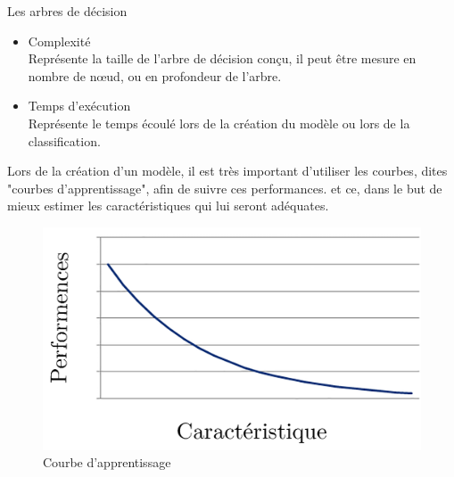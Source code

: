 \documentclass[a4paper, 11pt]{report}
\begin{document}
\begin{chapter}{Les arbres de décision}
\begin{itemize}
Représente un ratio entre le nombre de prédiction bien faite, et le nombre total de prédiction, ce ratio est estimé à partir de l'ensemble de test, qui n'à pas été utilisé lors de l'apprentissage.
\item Complexité\\
Représente la taille de l'arbre de décision conçu, il peut être mesure en nombre de nœud, ou en profondeur de l'arbre.
\item Temps d'exécution\\
Représente le temps écoulé lors de la création du modèle ou lors de la classification.
\end{itemize}
Lors de la création d'un modèle, il est très important d'utiliser les courbes, dites "courbes d'apprentissage", afin de suivre ces performances. et ce, dans le but de mieux estimer les caractéristiques qui lui seront adéquates. 

\begin{figure}[h!]
\begin{center}
\includegraphics[scale=0.5]{Images/courbe}
\caption{Courbe d'apprentissage}
\end{center}


\end{figure}
\end{chapter}
\end{document}
